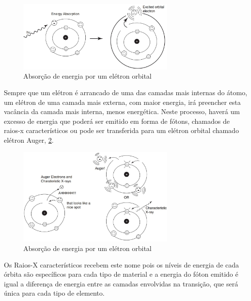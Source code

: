 \documentclass[11pt,a4paper]{article}
\begin{document}
	\begin{figure}[h]
		\centering
		\includegraphics[width=0.7\textwidth]{Imagens/absorcaoDeEnergiaPorEletronOrbital.jpg}
		\caption{Absorção de energia por um elétron orbital}
		\label{fig:absorcaoDeEnergiaPorEletronOrbital}
	\end{figure}

    Sempre que um elétron é arrancado de uma das camadas mais internas do átomo, um elétron de uma camada mais externa, com maior energia, irá preencher esta vacância da camada mais interna, menos energética. Neste processo, haverá um excesso de energia que poderá ser emitido em forma de fótons, chamados de raios-x característicos ou pode ser transferida para um elétron orbital chamado elétron Auger, \ref{fig:emissaoRaiosXCaracteristicosEEletronAuger}.

                \begin{figure}[h]
                    \centering
                    \includegraphics[width=0.7\textwidth]{Imagens/emissaoRaiosXCaracteristicosEEletronAuger.jpg}
                    \caption{Absorção de energia por um elétron orbital}
                    \label{fig:emissaoRaiosXCaracteristicosEEletronAuger}
                \end{figure}

    Os Raios-X característicos recebem este nome pois os níveis de energia de cada órbita são específicos para cada tipo de material e a energia do fóton emitido é igual a diferença de energia entre as camadas envolvidas na transição, que será única para cada tipo de elemento.
                
\end{document}
